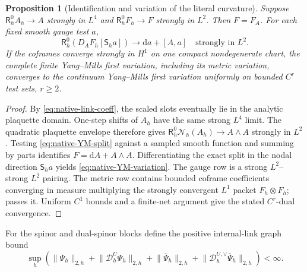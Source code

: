 \documentclass[11pt]{article}
\numberwithin{equation}{section}
\newtheorem{proposition}[proposition]{Proposition}
\theoremstyle{definition}
\theoremstyle{remark}
\newcommand{\dd}{\mathrm d}
\newcommand{\norm}[1]{\lVert#1\rVert}
\newcommand{\bPsi}{\overline\Psi}
\begin{document}
\begin{proposition}[Identification and variation of the literal curvature]
\label{prop:native-YM-identification}
Suppose $\mathsf R_h^0A_h\to A$ strongly in $L^4$ and
$\mathsf R_h^0F_h\to F$ strongly in $L^2$.  Then $F=F_A$.  For each fixed
smooth gauge test $a$,
\begin{equation}
 \mathsf R_h^0\left(D_AF_h[\mathsf S_ha]\right)
 \longrightarrow \dd a+[A,a]
 \quad\text{strongly in }L^2.
 \label{eq:native-YM-variation}
\end{equation}
If the coframes converge strongly in $H^1$ on one compact nondegenerate
chart, the complete finite Yang--Mills first variation, including its metric
variation, converges to the continuum Yang--Mills first variation uniformly
on bounded $C^r$ test sets, $r\ge2$.
\end{proposition}
\begin{proof}
By \eqref{eq:native-link-coeff}, the scaled slots eventually lie in the
analytic plaquette domain.  One-step shifts of $A_h$ have the same strong
$L^4$ limit.  The quadratic plaquette envelope therefore gives
$\mathsf R_h^0\mathcal N_h(A_h)\to A\wedge A$ strongly in $L^2$.
Testing \eqref{eq:native-YM-split} against a sampled smooth function and
summing by parts identifies $F=\dd A+A\wedge A$.  Differentiating the exact
split in the nodal direction $\mathsf S_ha$ yields
\eqref{eq:native-YM-variation}.  The gauge row is a strong $L^2$--strong
$L^2$ pairing.  The metric row contains bounded coframe coefficients
converging in measure multiplying the strongly convergent $L^1$ packet
$F_h\otimes F_h$;  passes it.  Uniform $C^1$ bounds and a
finite-net argument give the stated $C^r$-dual convergence.
\end{proof}

For the spinor and dual-spinor blocks define the positive internal-link graph
bound
\begin{equation}
 \sup_h\left(\norm{\Psi_h}_{2,h}+\norm{\mathcal D_h^U\Psi_h}_{2,h}
 +\norm{\bPsi_h}_{2,h}+\norm{\mathcal D_h^{U,\vee}\bPsi_h}_{2,h}\right)<\infty.
 \label{eq:native-spinor-graph}
\end{equation}
\end{document}
